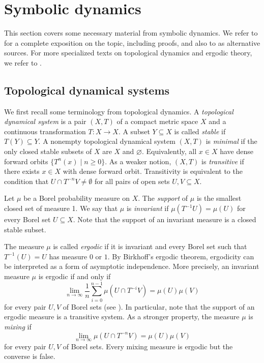 \documentclass[a4paper,UKenglish,numberwithinsect,cleveref]{lipics-v2021}
\begin{document}
\section{Symbolic dynamics}
\label{sec:dynamics}

This section covers some necessary material from symbolic dynamics. We refer to \cite{DurandPerrin2021} for a complete exposition on the topic, including proofs, and also to \cite{Fog02,Queffelec:10} as alternative sources. For more specialized texts on topological dynamics and ergodic theory, we refer to \cite{book/Petersen1983,Walters1982}.

\subsection{Topological dynamical systems}
\label{subsec:top-dynamics}

We first recall some terminology from topological dynamics. A \emph{topological dynamical system} 
is a pair $(X,T)$ of a compact metric space $X$ and a continuous transformation $T\colon X\to X$. A subset $Y\subseteq X$ is called \emph{stable} if $T(Y)\subseteq Y$. A nonempty topological dynamical system $(X,T)$ is \emph{minimal} if the only closed stable subsets of $X$ are $X$ and $\varnothing$. Equivalently, all $x\in X$ have dense forward orbits $\{T^n(x)\mid n\ge 0\}$. As a weaker notion, $(X,T)$ is \emph{transitive} if there exists $x\in X$ with dense forward orbit. Transitivity is equivalent to the condition that $U\cap T^{-n}V\ne\emptyset$ for all pairs of open sets $U,V\subseteq X$.

Let $\mu$ be a Borel probability measure on $X$. The \emph{support} of $\mu$ is the smallest closed set of measure 1. We say that $\mu$ is \emph{invariant} if $\mu(T^{-1}U)=\mu(U)$ for every Borel set $U\subseteq X$. Note that the support of an invariant measure is a closed stable subset. 

The measure $\mu$ is called \emph{ergodic} if it is invariant and every Borel set such that $T^{-1}(U)=U$ has measure $0$ or $1$. By Birkhoff's ergodic theorem, ergodicity can be interpreted as a form of asymptotic independence. More precisely, an invariant measure $\mu$ is ergodic if and only if
\begin{equation}
    \lim_{n\to\infty}\frac{1}{n}\sum_{i=0}^{n-1}\mu(U\cap T^{-i}V)=\mu(U)\mu(V)
    \label{eqErgodic}
\end{equation}
for every pair $U,V$ of Borel sets (see \cite{book/Petersen1983}). In particular, note that the support of an ergodic measure is a transitive system. As a stronger property, the measure $\mu$ is \emph{mixing} if 
  \begin{equation}
    \lim_{n\to\infty}\mu(U\cap T^{-n}V)=\mu(U)\mu(V)
    \label{eqMixing}
\end{equation}
for every pair $U,V$ of Borel sets. Every mixing measure is ergodic but the converse is false. 
\end{document}
